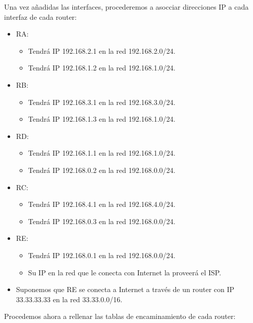 \begin{ejercicio}
    Una vez añadidas las interfaces, procederemos a asocciar direcciones IP a cada interfaz de cada router:
    \begin{itemize}
        \item RA:
            \begin{itemize}
                \item Tendrá IP 192.168.2.1 en la red 192.168.2.0/24.
                \item Tendrá IP 192.168.1.2 en la red 192.168.1.0/24.
            \end{itemize}
        \item RB:
            \begin{itemize}
                \item Tendrá IP 192.168.3.1 en la red 192.168.3.0/24.
                \item Tendrá IP 192.168.1.3 en la red 192.168.1.0/24.
            \end{itemize}
        \item RD:
            \begin{itemize}
                \item Tendrá IP 192.168.1.1 en la red 192.168.1.0/24.
                \item Tendrá IP 192.168.0.2 en la red 192.168.0.0/24.
            \end{itemize}
        \item RC: 
            \begin{itemize}
                \item Tendrá IP 192.168.4.1 en la red 192.168.4.0/24.
                \item Tendrá IP 192.168.0.3 en la red 192.168.0.0/24.
            \end{itemize}
        \item RE:
            \begin{itemize}
                \item Tendrá IP 192.168.0.1 en la red 192.168.0.0/24.
                \item Su IP en la red que le conecta con Internet la proveerá el ISP.
            \end{itemize}
        \item Suponemos que RE se conecta a Internet a través de un router con IP 33.33.33.33 en la red 33.33.0.0/16.
    \end{itemize}
    Procedemos ahora a rellenar las tablas de encaminamiento de cada router:
    \begin{table}[H]
    \centering

\end{table}
\end{ejercicio}
